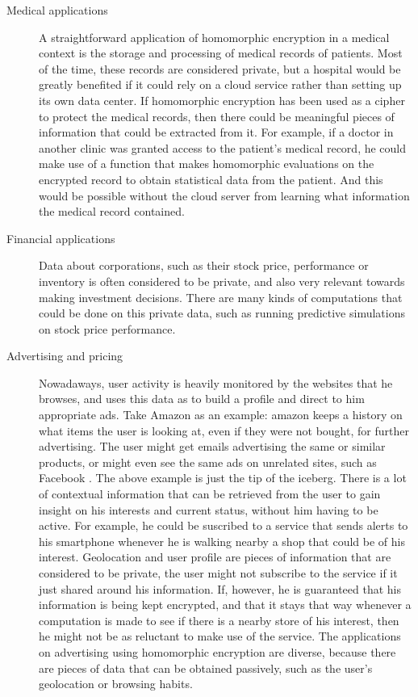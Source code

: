 \begin{description}
\item[Medical applications] A straightforward application of homomorphic encryption in a medical context is the storage and processing of medical records of patients. Most of the time, these records are considered private, but a hospital would be greatly benefited if it could rely on a cloud service rather than setting up its own data center. If homomorphic encryption has been used as a cipher to protect the medical records, then there could be meaningful pieces of information that could be extracted from it. For example, if a doctor in another clinic was granted access to the patient's medical record, he could make use of a function that makes homomorphic evaluations on the encrypted record to obtain statistical data from the patient. And this would be possible without the cloud server from learning what information the medical record contained.
\item[Financial applications] Data about corporations, such as their stock price, performance or inventory is often considered to be private, and also very relevant towards making investment decisions. There are many kinds of computations that could be done on this private data, such as running predictive simulations on stock price performance. 
\item[Advertising and pricing] Nowadaways, user activity is heavily monitored by the websites that he browses, and uses this data as to build a profile and direct to him appropriate ads. Take Amazon as an example: amazon keeps a history on what items the user is looking at, even if they were not bought, for further advertising. The user might get emails advertising the same or similar products, or might even see the same ads on unrelated sites, such as Facebook \cite{KimMai}. 
  The above example is just the tip of the iceberg. There is a lot of contextual information that can be retrieved from the user to gain insight on his interests and current status, without him having to be active. For example, he could be suscribed to a service that sends alerts to his smartphone whenever he is walking nearby a shop that could be of his interest. Geolocation and user profile are pieces of information that are considered to be private, the user might not subscribe to the service if it just shared around his information. If, however, he is guaranteed that his information is being kept encrypted, and that it stays that way whenever a computation is made to see if there is a nearby store of his interest, then he might not be as reluctant to make use of the service. The applications on advertising using homomorphic encryption are diverse, because there are pieces of data that can be obtained passively, such as the user's geolocation or browsing habits.

\end{description}
